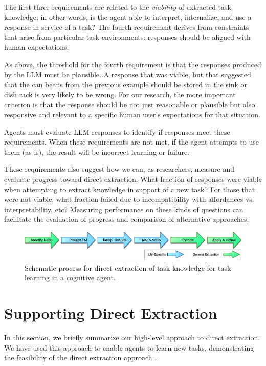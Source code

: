 \documentclass[letterpaper]{article} %
\begin{document}
The first three requirements are related to the \textit{viability} of extracted task knowledge; in other words, is the agent able to interpret, internalize, and use a response in service of a task? The fourth requirement derives from constraints that arise from particular task environments: responses should be aligned with human expectations.

As above, the threshold for the fourth requirement is that the responses produced by the LLM must be plausible. A response that was viable, but that suggested that the can beans from the previous example should be stored in the sink or dish rack is very likely to be wrong. For our research, the more important criterion is that the response should be not just reasonable or plausible but also responsive and relevant to a specific human user's expectations for that situation.


Agents must evaluate LLM responses to identify if responses meet these requirements. When these requirements are not met, if the agent attempts to use them (as is), the result will be incorrect learning or failure.

These requirements also suggest how we can, as researchers, measure and evaluate progress toward direct extraction. What fraction of responses were viable when attempting to extract knowledge in support of a new task? For those that were not viable, what fraction failed due to incompatibility with affordances vs. interpretability, etc? Measuring performance on these kinds of questions can facilitate the evaluation of progress and comparison of alternative approaches.



\begin{figure}[t]
\centering
\includegraphics[width=.9\columnwidth]{figures/ProcessingSteps.png}
\caption{Schematic process for direct extraction of task knowledge for task learning in a cognitive agent.}
\label{fig:processing-steps}
\end{figure}



\section{Supporting Direct Extraction}
In this section, we briefly summarize our high-level approach to direct extraction. We have used this approach to enable agents to learn new tasks, demonstrating the feasibility of the direct extraction approach \cite{kirk_improving_2022,kirk_improving_2023,kirk_integrating_2023}.
\end{document}
